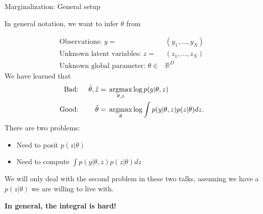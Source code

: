 

\begin{frame}{Marginalization: General setup}

In general notation, we want to infer $\theta$ from

\begin{align*}
    \textrm{Observations: }y ={}& (y_1, \ldots, y_N)\\
    \textrm{Unknown latent variables: }z ={}& (z_1, \ldots, z_N)\\
    \textrm{Unknown global parameter: }\theta \in{}& \mathbb{R}^D
\end{align*}
%
We have learned that
%
\begin{align*}
%
\textrm{Bad: }&& \thetahat, \hat{z} ={}& \argmax_{\theta, z} \log p(y | \theta, z)\\
\textrm{Good: }&& \thetahat ={}&
    \argmax_{\theta} \log \int p(y | \theta, z) p(z | \theta) dz.
%
\end{align*}
%
There are two problems:
%
\begin{itemize}
    \item Need to posit $p(z | \theta)$
    \item Need to compute $\int p(y | \theta, z) p(z | \theta) dz$
\end{itemize}
%

We will only deal with the second problem in these two talks, assuming
we have a $p(z | \theta)$ we are willing to live with.

\textbf{In general, the integral is hard!}


\end{frame}




